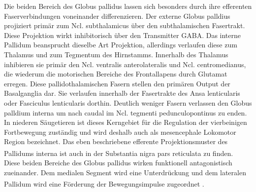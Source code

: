 Die beiden Bereich des Globus pallidus lassen sich besonders durch ihre efferenten Faserverbindungen voneinander differenzieren. Der externe Globus palldius projiziert primär zum Ncl. subthalamicus über den subthalamischen Fasertrakt. Diese Projektion wirkt inhibitorisch über den Transmitter GABA. Das interne Pallidum beansprucht dieselbe Art Projektion, allerdings verlaufen diese zum Thalamus und zum Tegmentum des Hirnstamms. Innerhalb des Thalamus inhibieren sie primär den Ncl. ventralis anterolateralis und Ncl. centromedianus, die wiederum die motorischen Bereiche des Frontallapens durch Glutamat erregen. Diese pallidothalamischen Fasern stellen den primären Output der Basalganglia dar. Sie verlaufen innerhalb der Fasertrakte des Ansa lenticularis oder Fasciculus lenticularis dorthin. Deutlich weniger Fasern verlassen den Globus palldium interna um nach caudal im Ncl. tegmenti pedunculopontinus zu enden. In niederen Säugetieren ist dieses Kerngebiet für die Regulation der vierbeinigen Fortbewegung zuständig und wird deshalb auch als mesencephale Lokomotor Region bezeichnet. Das eben beschriebene efferente Projektionsmuster des Pallidums interna ist auch in der Substantia nigra pars reticulata zu finden\textsuperscript{\cite[Kap.~14]{crossman2014neuroanatomy}}.\\          
Diese beiden Bereiche des Globus pallidus wirken funktionell antagonistisch zueinander. Dem medialen Segment wird eine Unterdrückung und dem lateralen Pallidum wird eine Förderung der Bewegungsimpulse zugeordnet \textsuperscript{\cite[Kap.~9]{trepel2011neuroanatomie}}.

